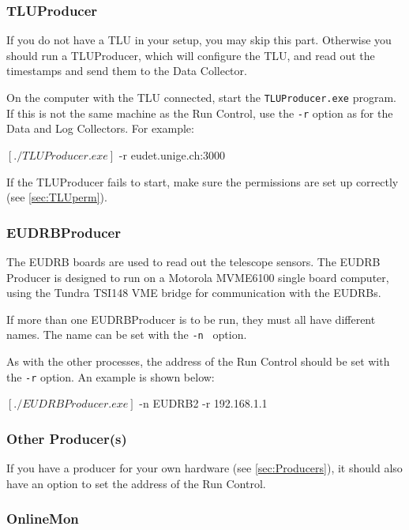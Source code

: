 \subsubsection{TLUProducer}
If you do not have a \gls{TLU} in your setup, you may skip this part.
Otherwise you should run a TLUProducer, which will configure the \gls{TLU},
and read out the timestamps and send them to the Data Collector.

On the computer with the \gls{TLU} connected, start the \texttt{TLUProducer.exe} program.
If this is not the same machine as the Run Control,
use the \texttt{-r} option as for the Data and Log Collectors.
For example:
\begin{listing}[mybash]
$[./TLUProducer.exe]$ -r eudet.unige.ch:3000
\end{listing}

If the TLUProducer fails to start, make sure the permissions are set up correctly (see \autoref{sec:TLUperm}).

\subsubsection{EUDRBProducer}
The \gls{EUDRB} boards are used to read out the telescope sensors.
The \gls{EUDRB} Producer is designed to run on a Motorola MVME6100 single board computer,
using the Tundra TSI148 VME bridge for communication with the \glspl{EUDRB}.

If more than one EUDRBProducer is to be run, they must all have different names.
The name can be set with the \texttt{-n } option.

As with the other processes, the address of the Run Control should be set with the \texttt{-r} option.
An example is shown below:
\begin{listing}[mybash]
$[./EUDRBProducer.exe]$ -n EUDRB2 -r 192.168.1.1
\end{listing}

\subsubsection{Other Producer(s)}
If you have a producer for your own hardware (see \autoref{sec:Producers}),
it should also have an option to set the address of the Run Control.

\subsubsection{OnlineMon}

